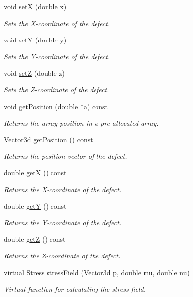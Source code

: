 \begin{DoxyCompactItemize}
void \hyperlink{classDefect_a5a65f73da6a572d9e7109b31239e441d}{set\-X} (double x)
\begin{DoxyCompactList}\small\item\em \-Sets the \-X-\/coordinate of the defect. \end{DoxyCompactList}\item 
void \hyperlink{classDefect_a268606391a4eaee3de029d2005648b6f}{set\-Y} (double y)
\begin{DoxyCompactList}\small\item\em \-Sets the \-Y-\/coordinate of the defect. \end{DoxyCompactList}\item 
void \hyperlink{classDefect_abb0b16c44a1b04d782f5c5f598b49d5b}{set\-Z} (double z)
\begin{DoxyCompactList}\small\item\em \-Sets the \-Z-\/coordinate of the defect. \end{DoxyCompactList}\item 
void \hyperlink{classDefect_a2bfcc6736a19eb9c4c8803ea0ea1e3f7}{get\-Position} (double $\ast$a) const 
\begin{DoxyCompactList}\small\item\em \-Returns the array position in a pre-\/allocated array. \end{DoxyCompactList}\item 
\hyperlink{classVector3d}{\-Vector3d} \hyperlink{classDefect_ad175c3f2b1fad6be48806dab69dfb32e}{get\-Position} () const 
\begin{DoxyCompactList}\small\item\em \-Returns the position vector of the defect. \end{DoxyCompactList}\item 
double \hyperlink{classDefect_a6e331ddeabd92e2edc124e6697d3bf7d}{get\-X} () const 
\begin{DoxyCompactList}\small\item\em \-Returns the \-X-\/coordinate of the defect. \end{DoxyCompactList}\item 
double \hyperlink{classDefect_ae307725c160984f44832fce5af896789}{get\-Y} () const 
\begin{DoxyCompactList}\small\item\em \-Returns the \-Y-\/coordinate of the defect. \end{DoxyCompactList}\item 
double \hyperlink{classDefect_a56e4a61e93d01dd765a921e3828af6c4}{get\-Z} () const 
\begin{DoxyCompactList}\small\item\em \-Returns the \-Z-\/coordinate of the defect. \end{DoxyCompactList}\item 
virtual \hyperlink{classStress}{\-Stress} \hyperlink{classDefect_a5730a89ce804d75090c9fa35ffdfefa2}{stress\-Field} (\hyperlink{classVector3d}{\-Vector3d} p, double mu, double nu)
\begin{DoxyCompactList}\small\item\em \-Virtual function for calculating the stress field. \end{DoxyCompactList}\end{DoxyCompactItemize}
